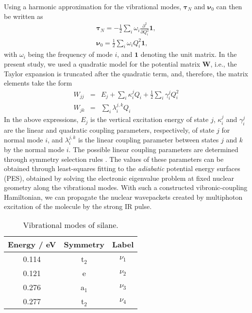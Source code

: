\documentclass[12pt]{article}
\begin{document}
Using a harmonic approximation for the vibrational modes, $\pmb{\tau}_N$ and $\pmb{\nu}_0$ can then be written as
%
\begin{eqnarray}
\pmb{\tau}_N = -\frac{1}{2}\sum_i\omega_i\frac{\partial^2}{\partial Q_i^2}\mathbf{1}, \\
\pmb{\nu}_0 = \frac{1}{2}\sum_i\omega_i Q_i^2\mathbf{1},
\end{eqnarray}
%
with $\omega_i$ being the frequency of mode $i$, and $\mathbf{1}$ denoting the unit matrix. In the present study, we used a quadratic model for the potential matrix $\mathbf{W}$, i.e., the Taylor expansion is truncated after the quadratic term, and, therefore, the matrix elements take the form
%
\begin{eqnarray}
W_{jj}&=&E_j+\sum_{i} \kappa_i^jQ_i+\frac{1}{2}\sum_{i}\gamma_i^jQ_i^2 \\
W_{jk}&=&\sum_{i}\lambda_i^{j,k}Q_i
\end{eqnarray}
%
In the above expressions, $E_j$ is the vertical excitation energy of state $j$, $\kappa_i^j$ and $\gamma_i^j$ are the linear and quadratic coupling parameters, respectively, of state $j$ for normal mode $i$, and $\lambda_i^{j,k}$ is the linear coupling parameter between states $j$ and $k$ by the normal mode $i$. The possible linear coupling parameters are determined through symmetry selection rules \cite{worth2004beyond}. The values of these parameters can be obtained through least-squares fitting to the \textit{adiabatic} potential energy surfaces (PES), obtained by solving the electronic eigenvalue problem at fixed nuclear geometry along the vibrational modes. With such a constructed vibronic-coupling Hamiltonian, we can propagate the nuclear wavepackets created by multiphoton excitation of the molecule by the strong IR pulse.

\begin{table}
\centering
\caption{\label{Tab1}Vibrational modes of silane.}
\vspace{0.3cm}
\begin{tabular}{ccc} 
 \hline\hline
 Energy / eV & Symmetry & Label \\ 
 \hline
 0.114 & t$_2$ & $\nu_1$ \\ 
 0.121 & e & $\nu_2$ \\
 0.276 & a$_1$ & $\nu_3$ \\
 0.277 & t$_2$ & $\nu_4$ \\ 
 \hline
\end{tabular}
\end{table}
\end{document}
